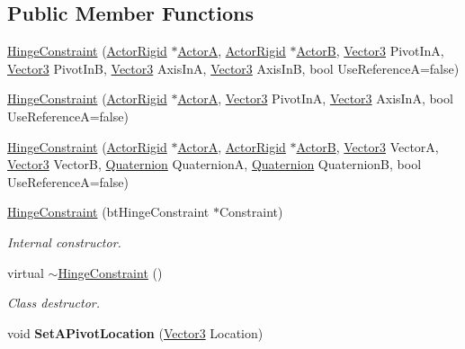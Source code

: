 \subsection*{Public Member Functions}
\begin{DoxyCompactItemize}
\item 
\hyperlink{classphys_1_1HingeConstraint_a079d149580bb7f60e09532a938352141}{HingeConstraint} (\hyperlink{classphys_1_1ActorRigid}{ActorRigid} $\ast$\hyperlink{classphys_1_1TypedConstraint_a0fefb80c80d433bec9942b851b2f5a8a}{ActorA}, \hyperlink{classphys_1_1ActorRigid}{ActorRigid} $\ast$\hyperlink{classphys_1_1TypedConstraint_a04d2c49698d9a161e92112dd1efc1dcd}{ActorB}, \hyperlink{classphys_1_1Vector3}{Vector3} PivotInA, \hyperlink{classphys_1_1Vector3}{Vector3} PivotInB, \hyperlink{classphys_1_1Vector3}{Vector3} AxisInA, \hyperlink{classphys_1_1Vector3}{Vector3} AxisInB, bool UseReferenceA=false)
\item 
\hyperlink{classphys_1_1HingeConstraint_aa49fe941387343b75d26a3603aafe09e}{HingeConstraint} (\hyperlink{classphys_1_1ActorRigid}{ActorRigid} $\ast$\hyperlink{classphys_1_1TypedConstraint_a0fefb80c80d433bec9942b851b2f5a8a}{ActorA}, \hyperlink{classphys_1_1Vector3}{Vector3} PivotInA, \hyperlink{classphys_1_1Vector3}{Vector3} AxisInA, bool UseReferenceA=false)
\item 
\hyperlink{classphys_1_1HingeConstraint_acf99af18e95c5b42119d91aff8a02a2a}{HingeConstraint} (\hyperlink{classphys_1_1ActorRigid}{ActorRigid} $\ast$\hyperlink{classphys_1_1TypedConstraint_a0fefb80c80d433bec9942b851b2f5a8a}{ActorA}, \hyperlink{classphys_1_1ActorRigid}{ActorRigid} $\ast$\hyperlink{classphys_1_1TypedConstraint_a04d2c49698d9a161e92112dd1efc1dcd}{ActorB}, \hyperlink{classphys_1_1Vector3}{Vector3} VectorA, \hyperlink{classphys_1_1Vector3}{Vector3} VectorB, \hyperlink{classphys_1_1Quaternion}{Quaternion} QuaternionA, \hyperlink{classphys_1_1Quaternion}{Quaternion} QuaternionB, bool UseReferenceA=false)
\item 
\hyperlink{classphys_1_1HingeConstraint_ab326e7128413aa3b737b726b3513c8df}{HingeConstraint} (btHingeConstraint $\ast$Constraint)
\begin{DoxyCompactList}\small\item\em Internal constructor. \item\end{DoxyCompactList}\item 
virtual \hyperlink{classphys_1_1HingeConstraint_af97da06f82fa1903bb20393760f4ae34}{$\sim$HingeConstraint} ()
\begin{DoxyCompactList}\small\item\em Class destructor. \item\end{DoxyCompactList}\item 
\hypertarget{classphys_1_1HingeConstraint_afa922bdd01eaa8e8c1bbafff1c5f7500}{
void {\bfseries SetAPivotLocation} (\hyperlink{classphys_1_1Vector3}{Vector3} Location)}
\label{d3/d0d/classphys_1_1HingeConstraint_afa922bdd01eaa8e8c1bbafff1c5f7500}


\end{DoxyCompactItemize}
